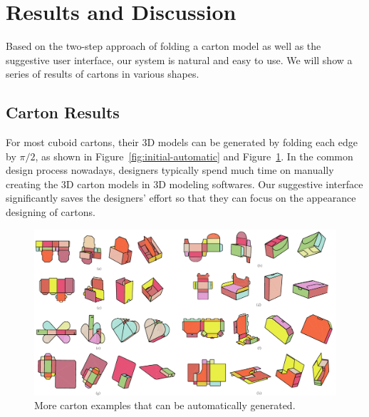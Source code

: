\section{Results and Discussion}\label{sec:result}


Based on the two-step approach of folding a carton model as well as the suggestive user interface, our system is natural and easy to use. 
%
We will show a series of results of cartons in various shapes. 
%

\subsection{Carton Results}


For most cuboid cartons, their 3D models can be generated by folding each edge by $\pi/2$, as shown in Figure~\ref{fig:initial-automatic} and Figure~\ref{fig:automatic-more}.
In the common design process nowadays, designers typically spend much time on manually creating the 3D carton models in 3D modeling softwares. 
Our suggestive interface significantly saves the designers' effort so that they can focus on the appearance designing of cartons. 


\begin{figure}
	\centering
	\includegraphics[width=\textwidth]{images/moreAutomatic}
	\caption{More carton examples that can be automatically generated.   }
	\label{fig:automatic-more}
	
\end{figure}

